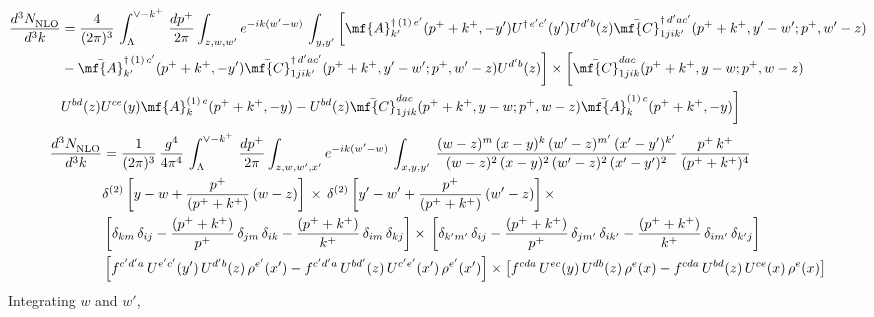 \begin{align}
    \frac{d^{3}N_{\rm NLO}^{\rm}}{d^{3}k}  & = \frac{4}{(2\pi)^{3}}\,\int_{\Lambda}^{\vee-k^{+}}\, \frac{dp^{+}}{2\pi}\int_{z,w,w^{\prime}} e^{-ik(w^{\prime}-w)}\,  \int_{y,y^{\prime}}\bigg[\mf{A}^{\dagger\, (1)\,e^{\prime}}_{k^{\prime}}(p^{+}+k^{+},-y^{\prime})U^{\dagger\, e^{\prime}c^{\prime}}(y^{\prime})U^{d^{\prime}b}(z) \Bar{\mf{C}}^{\dagger\, d^{\prime}ac^{\prime}}_{1jik^{\prime}}(p^{+}+k^{+},y^{\prime}-w^{\prime}; p^{+},w^{\prime}-z) \notag \\ &  -\Bar{\mf{A}}^{\dagger\, (1)\,c^{\prime}}_{k^{\prime}}(p^{+}+k^{+},-y^{\prime}) \Bar{\mf{C}}^{\dagger\, d^{\prime}ac^{\prime}}_{1jik^{\prime}}(p^{+}+k^{+},y^{\prime}-w^{\prime}; p^{+},w^{\prime}-z)U^{d^{\prime}b}(z)\bigg]\times\bigg[\Bar{\mf{C}}^{dac}_{1jik}(p^{+}+k^{+},y-w; p^{+},w-z)\notag \\ & U^{bd}(z)U^{ce}(y) \mf{A}^{(1)\,e}_{k}(p^{+}+k^{+},-y) -U^{bd}(z) \Bar{\mf{C}}^{dac}_{1jik}(p^{+}+k^{+},y-w; p^{+},w-z)\Bar{\mf{A}}^{(1)\,c}_{k}(p^{+}+k^{+},-y)\bigg]\nonumber
\end{align}
\begin{align}
     \frac{d^{3}N_{\rm NLO}^{\rm}}{d^{3}k}  & = \frac{1}{(2\pi)^{3}}\,\frac{g^{4}}{4\pi^{4}}\,\int_{\Lambda}^{\vee-k^{+}}\, \frac{dp^{+}}{2\pi}\int_{z,w,w^{\prime},x'} e^{-ik(w^{\prime}-w)}\,  \int_{x,y,y^{\prime}}\,\frac{(w-z)^{m}\,(x-y)^{k}\,(w'-z)^{m'}\,(x'-y')^{k'}}{(w-z)^{2}\,(x-y)^{2}\,(w'-z)^{2}\,(x'-y')^{2}}\,\frac{p^{+}\,k^{+}}{(p^{+}+k^{+})^{4}}\notag \\ & \delta^{(2)}\left[y-w+\frac{p^{+}}{(p^{+}+k^{+})}\,(w-z)\right]\,\times\, \delta^{(2)}\left[y'-w'+\frac{p^{+}}{(p^{+}+k^{+})}\,(w'-z)\right]\times\notag \\ &  \left[\delta_{km}\,\delta_{ij}-\frac{(p^{+}+k^{+})}{p^{+}}\,\delta_{jm}\,\delta_{ik}-\frac{(p^{+}+k^{+})}{k^{+}}\,\delta_{im}\,\delta_{kj}\right]\times\, \left[\delta_{k'm'}\,\delta_{ij}-\frac{(p^{+}+k^{+})}{p^{+}}\,\delta_{jm'}\,\delta_{ik'}-\frac{(p^{+}+k^{+})}{k^{+}}\,\delta_{im'}\,\delta_{k'j}\right]\notag \\ & \left[f^{c'd'a}\,U^{e'c'}(y')\,U^{d'b}(z)\,\rho^{e'}(x')-f^{c'd'a}\, 
    U^{bd'}(z)\,U^{c'e'}(x')\,\rho^{e'}(x')\right]\times \left[f^{cda}\,U^{ec}(y)\,U^{db}(z)\,\rho^{e}(x)-f^{cda}\, 
    U^{bd}(z)\,U^{ce}(x)\,\rho^{e}(x)\right]
\end{align}
Integrating $w$ and $w'$,
